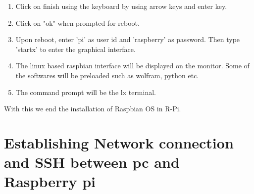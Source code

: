 \documentclass[11pt,a4paper]{report}
\begin{document}
\begin{enumerate}
\begin{itemize}
\begin{figure}[h!]
				\centering
				\caption{}	
			\end{figure}
		\end{itemize}
	\newpage
	
	\item Click on finish using the keyboard by using arrow keys and enter key.
	\item Click on "ok" when prompted for reboot.
	\item Upon reboot, enter 'pi' as user id and 'raspberry' as password. Then type 'startx' to enter the graphical interface.
	\item The linux based raspbian interface will be displayed on the monitor. Some of the softwares will be preloaded such as wolfram, python etc.
	\item The command prompt will be the lx terminal.
	\end{enumerate}
	
	With this we end the installation of Raspbian OS in R-Pi.
	
	\vspace{0.4cm} 
	\newpage
	
	\chapter{Establishing Network connection and SSH between pc and Raspberry pi }
\end{document}
